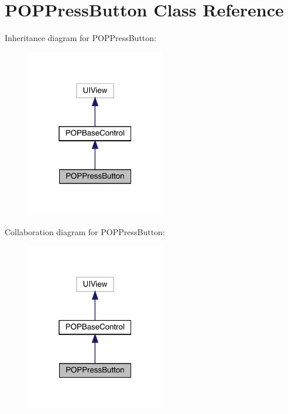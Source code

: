 \hypertarget{interface_p_o_p_press_button}{}\section{P\+O\+P\+Press\+Button Class Reference}
\label{interface_p_o_p_press_button}


Inheritance diagram for P\+O\+P\+Press\+Button\+:\nopagebreak
\begin{figure}[H]
\begin{center}
\leavevmode
\includegraphics[width=172pt]{interface_p_o_p_press_button__inherit__graph}
\end{center}
\end{figure}


Collaboration diagram for P\+O\+P\+Press\+Button\+:\nopagebreak
\begin{figure}[H]
\begin{center}
\leavevmode
\includegraphics[width=172pt]{interface_p_o_p_press_button__coll__graph}
\end{center}
\end{figure}
